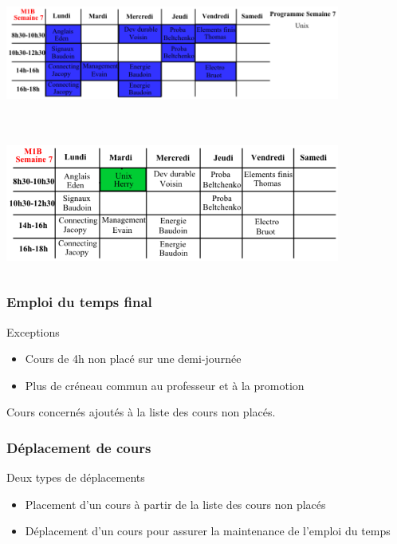 \documentclass{beamer}
\begin{document}
\begin{frame}
\begin{center}
\includegraphics [width=110mm, height=45mm]{Dessin5.png}
\end{center}
\end{frame}

\begin{frame}
\begin{center}
\includegraphics [width=110mm, height=45mm]{Dessin6.png}
\end{center}
\end{frame}

\begin{frame}
\frametitle{Emploi du temps final}
\begin{block}{Exceptions}
\begin{itemize}
\item Cours de 4h non placé sur une demi-journée
\item Plus de créneau commun au professeur et à la promotion\\
\end{itemize}
\end{block}
\vspace{0.6cm}
Cours concernés ajoutés à la liste des cours non placés.
\end{frame}

\begin{frame}
\frametitle{Déplacement de cours}
\begin{block}{Deux types de déplacements}
\begin{itemize}
\item Placement d'un cours à partir de la liste des cours non placés
\item Déplacement d'un cours pour assurer la maintenance de l'emploi du temps
\end{itemize}
\end{block}
\end{frame}
\end{document}
